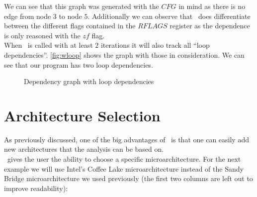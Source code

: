 We can see that this graph was generated with the $CFG$ in mind as there is no edge from node $3$ to node $5$. Additionally we can observe that \suaca\ does differentiate between the different flags contained in the $RFLAGS$ register as the dependence is only reasoned with the $zf$ flag.\\
When \suaca\ is called with at least $2$ iterations it will also track all ``loop dependencies''. \autoref{fig:wloop} shows the graph with those in consideration. We can see that our program has two loop dependencies.

\begin{figure}
    \centering
    \caption{Dependency graph with loop dependencies}
    \label{fig:wloop}
\end{figure}

\FloatBarrier

\section{Architecture Selection}

As previously discussed, one of the big advantages of \suaca\ is that one can easily add new architectures that the analysis can be based on.\\
\suaca\ gives the user the ability to choose a specific microarchitecture. For the next example we will use Intel's Coffee Lake microarchitecture instead of the Sandy Bridge microarchitecture we used previously (the first two columns are left out to improve readability):\\

